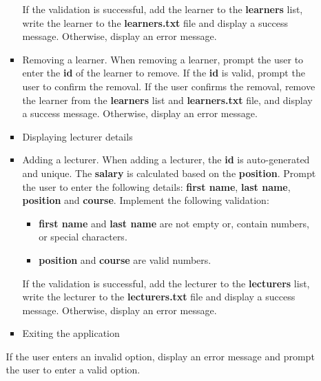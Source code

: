 \documentclass{article}
\begin{document}
\begin{itemize}
\begin{itemize}
\begin{itemize}
\begin{itemize}
            \end{itemize} 
            If the validation is successful, add the learner to the \textbf{learners} list, write the learner to the \textbf{learners.txt} file and display a success message. Otherwise, display an error message.             
            \item Removing a learner. When removing a learner, prompt the user to enter the \textbf{id} of the learner to remove. If the \textbf{id} is valid, prompt the user to confirm the removal. If the user confirms the removal, remove the learner from the \textbf{learners} list and \textbf{learners.txt} file, and display a success message. Otherwise, display an error message.             
            \item Displaying lecturer details
            \item Adding a lecturer. When adding a lecturer, the \textbf{id} is auto-generated and unique. The \textbf{salary} is calculated based on the \textbf{position}. Prompt the user to enter the following details: \textbf{first name}, \textbf{last name}, \textbf{position} and \textbf{course}. Implement the following validation:
            \begin{itemize}
                \item \textbf{first name} and \textbf{last name} are not empty or, contain numbers, or special characters.
                \item \textbf{position} and \textbf{course} are valid numbers.
            \end{itemize}
            If the validation is successful, add the lecturer to the \textbf{lecturers} list, write the lecturer to the \textbf{lecturers.txt} file and display a success message. Otherwise, display an error message.
            \item Exiting the application
        \end{itemize} 
        If the user enters an invalid option, display an error message and prompt the user to enter a valid option.
    \end{itemize}
\end{itemize}

\newpage
\end{document}
